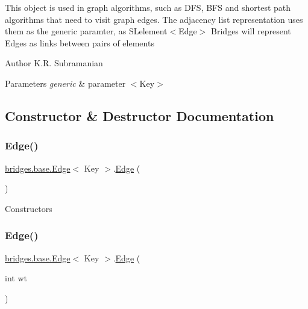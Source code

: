 This object is used in graph algorithms, such as D\+FS, B\+FS and shortest path algorithms that need to visit graph edges. The adjacency list representation uses them as the generic paramter, as S\+Lelement$<$\+Edge$>$ Bridges will represent Edges as links between pairs of elements

\begin{DoxyAuthor}{Author}
K.\+R. Subramanian
\end{DoxyAuthor}

\begin{DoxyParams}{Parameters}
{\em generic} & parameter $<$\+Key$>$ \\
\hline
\end{DoxyParams}


\subsection{Constructor \& Destructor Documentation}
\hypertarget{classbridges_1_1base_1_1_edge_ac070f05141bfbc7c575591e59d508476}{}\label{classbridges_1_1base_1_1_edge_ac070f05141bfbc7c575591e59d508476} 
\subsubsection{\texorpdfstring{Edge()}{Edge()}\hspace{0.1cm}{\footnotesize\ttfamily [1/3]}}
{\footnotesize\ttfamily \hyperlink{classbridges_1_1base_1_1_edge}{bridges.\+base.\+Edge}$<$ Key $>$.\hyperlink{classbridges_1_1base_1_1_edge}{Edge} (\begin{DoxyParamCaption}{ }\end{DoxyParamCaption})}

Constructors \hypertarget{classbridges_1_1base_1_1_edge_a8567ee2a3d4d655f0a2a2258767238d6}{}\label{classbridges_1_1base_1_1_edge_a8567ee2a3d4d655f0a2a2258767238d6} 
\subsubsection{\texorpdfstring{Edge()}{Edge()}\hspace{0.1cm}{\footnotesize\ttfamily [2/3]}}
{\footnotesize\ttfamily \hyperlink{classbridges_1_1base_1_1_edge}{bridges.\+base.\+Edge}$<$ Key $>$.\hyperlink{classbridges_1_1base_1_1_edge}{Edge} (\begin{DoxyParamCaption}\item[{int}]{wt }\end{DoxyParamCaption})}

